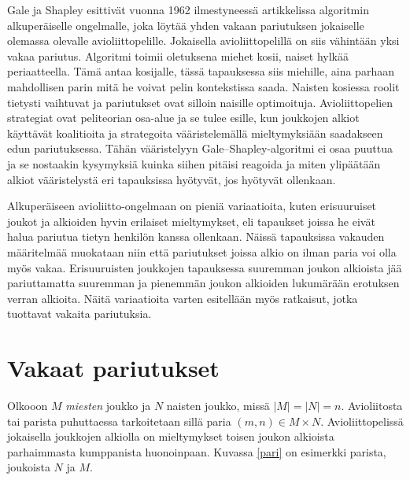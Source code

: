 \documentclass[finnish]{tktltiki2}
\theoremstyle{definition}
\theoremstyle{remark}
\begin{document}
Gale ja Shapley esittivät vuonna 1962 ilmestyneessä artikkelissa \cite{gale62a} algoritmin alkuperäiselle ongelmalle, joka löytää yhden vakaan pariutuksen jokaiselle olemassa olevalle avioliittopelille. Jokaisella avioliittopelillä on siis vähintään yksi vakaa pariutus. Algoritmi toimii oletuksena miehet kosii, naiset hylkää periaatteella. Tämä antaa kosijalle, tässä tapauksessa siis miehille, aina parhaan mahdollisen parin mitä he voivat pelin kontekstissa saada. Naisten kosiessa roolit tietysti vaihtuvat ja pariutukset ovat silloin naisille optimoituja.
Avioliittopelien strategiat ovat peliteorian osa-alue ja se tulee esille, kun joukkojen alkiot käyttävät koalitioita ja strategoita vääristelemällä mieltymyksiään saadakseen edun pariutuksessa. Tähän vääristelyyn Gale--Shapley-algoritmi ei osaa puuttua ja se nostaakin kysymyksiä kuinka siihen pitäisi reagoida ja miten ylipäätään alkiot vääristelystä eri tapauksissa hyötyvät, jos hyötyvät ollenkaan.

Alkuperäiseen avioliitto-ongelmaan on pieniä variaatioita, kuten erisuuruiset joukot ja alkioiden hyvin erilaiset mieltymykset, eli tapaukset joissa he eivät halua pariutua tietyn henkilön kanssa ollenkaan. Näissä tapauksissa vakauden määritelmää muokataan niin että pariutukset joissa alkio on ilman paria voi olla myös vakaa. Erisuuruisten joukkojen tapauksessa suuremman joukon alkioista jää pariuttamatta suuremman ja pienemmän joukon alkioiden lukumärään erotuksen verran alkioita. Näitä variaatioita varten esitellään myös ratkaisut, jotka tuottavat vakaita pariutuksia.

\section{Vakaat pariutukset}
Olkooon $M$ \emph{miesten} joukko ja $N$ naisten joukko, missä $|M| = |N| = n$. Avioliitosta tai parista puhuttaessa tarkoitetaan sillä paria $(m, n) \in M \times N$. Avioliittopelissä jokaisella joukkojen alkiolla on mieltymykset toisen joukon alkioista parhaimmasta kumppanista huonoinpaan. Kuvassa \ref{pari} on esimerkki parista, joukoista $N$ ja $M$.
\end{document}
